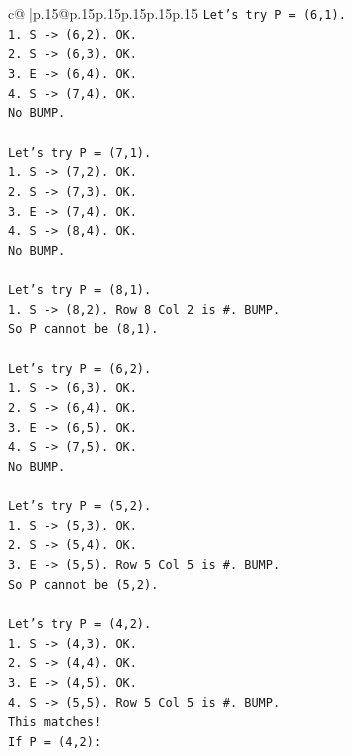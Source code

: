 \documentclass{article}
\begin{document}
{\begin{supertabular}{c@{$\;$}|p{.15\linewidth}@{}p{.15\linewidth}p{.15\linewidth}p{.15\linewidth}p{.15\linewidth}p{.15\linewidth}}
{{{\texttt{Let's try P = (6,1).} \\
\texttt{1. S {-}> (6,2). OK.} \\
\texttt{2. S {-}> (6,3). OK.} \\
\texttt{3. E {-}> (6,4). OK.} \\
\texttt{4. S {-}> (7,4). OK.} \\
\texttt{No BUMP.} \\
\\ 
\texttt{Let's try P = (7,1).} \\
\texttt{1. S {-}> (7,2). OK.} \\
\texttt{2. S {-}> (7,3). OK.} \\
\texttt{3. E {-}> (7,4). OK.} \\
\texttt{4. S {-}> (8,4). OK.} \\
\texttt{No BUMP.} \\
\\ 
\texttt{Let's try P = (8,1).} \\
\texttt{1. S {-}> (8,2). Row 8 Col 2 is \#. BUMP.} \\
\texttt{So P cannot be (8,1).} \\
\\ 
\texttt{Let's try P = (6,2).} \\
\texttt{1. S {-}> (6,3). OK.} \\
\texttt{2. S {-}> (6,4). OK.} \\
\texttt{3. E {-}> (6,5). OK.} \\
\texttt{4. S {-}> (7,5). OK.} \\
\texttt{No BUMP.} \\
\\ 
\texttt{Let's try P = (5,2).} \\
\texttt{1. S {-}> (5,3). OK.} \\
\texttt{2. S {-}> (5,4). OK.} \\
\texttt{3. E {-}> (5,5). Row 5 Col 5 is \#. BUMP.} \\
\texttt{So P cannot be (5,2).} \\
\\ 
\texttt{Let's try P = (4,2).} \\
\texttt{1. S {-}> (4,3). OK.} \\
\texttt{2. S {-}> (4,4). OK.} \\
\texttt{3. E {-}> (4,5). OK.} \\
\texttt{4. S {-}> (5,5). Row 5 Col 5 is \#. BUMP.} \\
\texttt{This matches!} \\
\texttt{If P = (4,2):} \\
}}}
\end{supertabular}}
\end{document}
